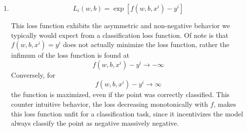 \documentclass{article} %
\begin{document}
\begin{enumerate}
    This loss function exhibits intuitive (correct classifications
      are minimally penalized and incorrect classifications are
    maximally penalized) and symmetric
    behavior, that is $y_i = \pm 1, f(x_i) = \pm 1 \implies L_i = 0$
    and $y_i = \pm 1, f(x_i) = \mp 1 \implies L_i = 16$. The loss
    function is also differentiable everywhere, as well as being
    convex, making it ideal for optimization. However, it has a few
    major drawbacks that make it less ideal for classification.
    Firstly, this loss function dictates that the model should
    exactly output $-1$ or $1$, when in reality we're looking for a
    plane separating the data. Because of this, the optimum that this
    loss function pushes the model towards does not maximize the
    margin, and would not generalize well at all to new data.
    Another, more practical than philosophical problem, is that the
    gradient is cubic, meaning that even slightly large error explode
    and dominate the gradient decent algorithm, this decreases the
    stability of the gradient decent algorithm, and would likely
    cause a many algorithms to diverge.

    The partial derivatives are:
    \begin{align*}
      \frac{\partial L_i}{\partial w_n} &=
      -4(y_i - f(w,b,x_i))^3(x^i_n)
      = 4(f(w,b,x_i) - y_i)^3(x^i_n)\\
      \frac{\partial L_i}{\partial b} &=
      -4(y_i - f(w,b,x_i))^3
      = 4(f(w,b,x_i) - y_i)^3
    \end{align*}
    Thus
    \[
      \nabla L_i =
      4(f(w,b,x_i) - y_i)^3
      \begin{pmatrix}
        x^i \\
        1
      \end{pmatrix}
    \]

  \item
    \[
      L_i(w,b) = \exp[f(w,b,x^i) - y^i]
    \]

    This loss function exhibits the asymmetric and non-negative
    behavior we typically would expect from a classification loss
    function. Of note is that $f(w, b, x^i) = y^i$ does not actually
    minimize the loss function, rather the infimum of the loss
    function is found at $$f(w, b, x^i) - y^i \to -\infty$$
    Conversely, for $$f(w, b, x^i) - y^i \to \infty$$
    the function is maximized, even if the point was correctly
    classified. This counter intuitive behavior, the loss decreasing
    monotonically with $f$, makes this loss
    function unfit for a classification task, since it
    incentivizes the model always classify the point as negative
    massively negative.


\end{enumerate}
\end{document}
